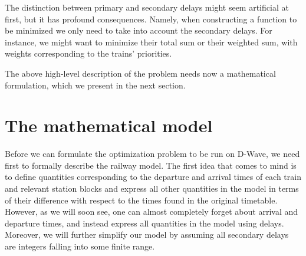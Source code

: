 The distinction between primary and secondary delays might seem artificial at
first, but it has profound consequences. Namely, when constructing a function
to be minimized we only need to take into account the secondary delays. For
instance, we might want to minimize their total sum or their weighted sum, with
weights corresponding to the trains' priorities.

The above high-level description of the problem needs now a mathematical
formulation, which we present in the next section.

\section{The mathematical model}
Before we can formulate the optimization problem to be run on D-Wave, we need
first to formally describe the railway model. The first idea that comes to mind
is to define quantities corresponding to the departure and arrival times of each
train and relevant station blocks and express all other quantities in the
model in terms of their difference with respect to the times found in the
original timetable. However, as we will soon see, one can almost completely
forget about arrival and departure times, and instead express all quantities in
the model using delays. Moreover, we will further simplify our model by
assuming all secondary delays are integers falling into some finite range.

